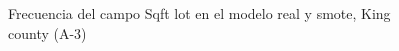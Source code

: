 \begin{figure}[H]
    \centering
    
    \caption{Frecuencia del campo Sqft lot en el modelo real y smote, King county (A-3)}
    \label{frecuency-smote-sqft lot}
\end{figure}
